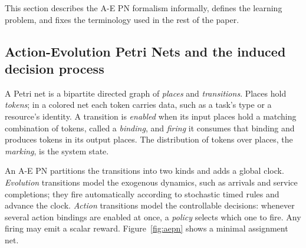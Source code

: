 \documentclass[review,authoryear,3p,times]{elsarticle}
\begin{document}
This section describes the A-E PN formalism informally, defines the learning
problem, and fixes the terminology used in the rest of the paper.

\subsection{Action-Evolution Petri Nets and the induced decision process}

A Petri net is a bipartite directed graph of \emph{places} and
\emph{transitions}. Places hold \emph{tokens}; in a colored net each token
carries data, such as a task's type or a resource's identity. A transition is
\emph{enabled} when its input places hold a matching combination of tokens,
called a \emph{binding}, and \emph{firing} it consumes that binding and
produces tokens in its output places. The distribution of tokens over places,
the \emph{marking}, is the system state.

An A-E PN \citep{aepn2023} partitions the transitions into two kinds and adds a
global clock. \emph{Evolution} transitions model the exogenous dynamics, such
as arrivals and service completions; they fire automatically according to
stochastic timed rules and advance the clock. \emph{Action} transitions model
the controllable decisions: whenever several action bindings are enabled at
once, a \emph{policy} selects which one to fire. Any firing may emit a scalar
reward. Figure~\ref{fig:aepn} shows a minimal assignment net.
\end{document}
